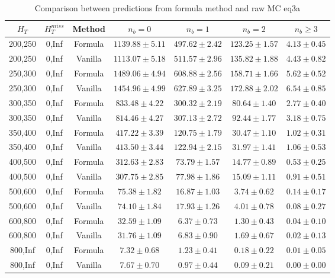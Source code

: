 
\begin{longtable}{ | c | c | c | c | c | c | c | }
\caption{Comparison between predictions from formula method and raw MC eq3a} \label{tab:formula-eq3a} \\    \hline 
$H_{T}$ & $H_{T}^{miss}$ & Method & $n_{b} = 0$ & $n_{b} = 1$ & $n_{b} = 2$ & $n_{b} \ge 3$ \\ \hline200,250 & 0,Inf & Formula  & $  1139.88 \pm  5.11 $ & $   497.62 \pm  2.42 $ & $   123.25 \pm  1.57 $ & $     4.13 \pm  0.45 $  \\  
200,250 & 0,Inf & Vanilla  & $  1113.07 \pm  5.18 $ & $   511.57 \pm  2.96 $ & $   135.82 \pm  1.88 $ & $     4.43 \pm  0.82 $  \\ \hline 
250,300 & 0,Inf & Formula  & $  1489.06 \pm  4.94 $ & $   608.88 \pm  2.56 $ & $   158.71 \pm  1.66 $ & $     5.62 \pm  0.52 $  \\  
250,300 & 0,Inf & Vanilla  & $  1454.96 \pm  4.99 $ & $   627.89 \pm  3.25 $ & $   172.88 \pm  2.02 $ & $     6.54 \pm  0.85 $  \\ \hline 
300,350 & 0,Inf & Formula  & $   833.48 \pm  4.22 $ & $   300.32 \pm  2.19 $ & $    80.64 \pm  1.40 $ & $     2.77 \pm  0.40 $  \\  
300,350 & 0,Inf & Vanilla  & $   814.46 \pm  4.27 $ & $   307.13 \pm  2.72 $ & $    92.44 \pm  1.77 $ & $     3.18 \pm  0.75 $  \\ \hline 
350,400 & 0,Inf & Formula  & $   417.22 \pm  3.39 $ & $   120.75 \pm  1.79 $ & $    30.47 \pm  1.10 $ & $     1.02 \pm  0.31 $  \\  
350,400 & 0,Inf & Vanilla  & $   413.50 \pm  3.44 $ & $   122.94 \pm  2.15 $ & $    31.97 \pm  1.41 $ & $     1.06 \pm  0.53 $  \\ \hline 
400,500 & 0,Inf & Formula  & $   312.63 \pm  2.83 $ & $    73.79 \pm  1.57 $ & $    14.77 \pm  0.89 $ & $     0.53 \pm  0.25 $  \\  
400,500 & 0,Inf & Vanilla  & $   307.75 \pm  2.85 $ & $    77.98 \pm  1.86 $ & $    15.09 \pm  1.11 $ & $     0.91 \pm  0.51 $  \\ \hline 
500,600 & 0,Inf & Formula  & $    75.38 \pm  1.82 $ & $    16.87 \pm  1.03 $ & $     3.74 \pm  0.62 $ & $     0.14 \pm  0.17 $  \\  
500,600 & 0,Inf & Vanilla  & $    74.10 \pm  1.84 $ & $    17.93 \pm  1.26 $ & $     4.01 \pm  0.78 $ & $     0.08 \pm  0.27 $  \\ \hline 
600,800 & 0,Inf & Formula  & $    32.59 \pm  1.09 $ & $     6.37 \pm  0.73 $ & $     1.30 \pm  0.43 $ & $     0.04 \pm  0.10 $  \\  
600,800 & 0,Inf & Vanilla  & $    31.76 \pm  1.09 $ & $     6.83 \pm  0.90 $ & $     1.69 \pm  0.67 $ & $     0.02 \pm  0.13 $  \\ \hline 
800,Inf & 0,Inf & Formula  & $     7.32 \pm  0.68 $ & $     1.23 \pm  0.41 $ & $     0.18 \pm  0.22 $ & $     0.01 \pm  0.05 $  \\  
800,Inf & 0,Inf & Vanilla  & $     7.67 \pm  0.70 $ & $     0.97 \pm  0.44 $ & $     0.09 \pm  0.21 $ & $     0.00 \pm  0.00 $  \\ \hline 
    \hline 
    \hline 
\end{longtable}